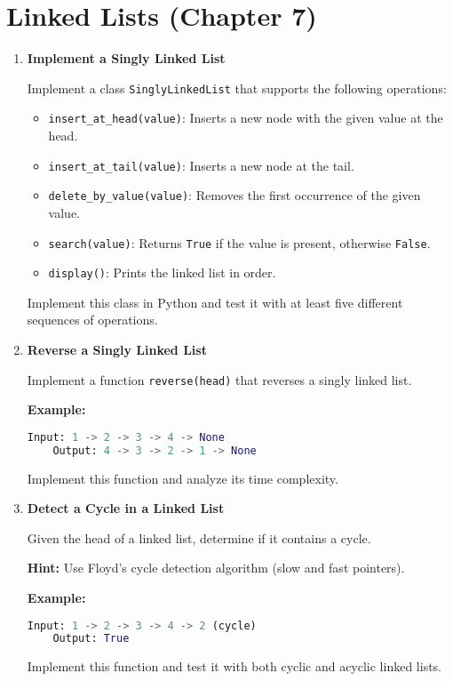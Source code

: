 \documentclass{article}
\begin{document}
\section*{Linked Lists (Chapter 7)}

\begin{enumerate}
    \item \textbf{Implement a Singly Linked List}
    
    Implement a class \texttt{SinglyLinkedList} that supports the following operations:
    \begin{itemize}
        \item \texttt{insert\_at\_head(value)}: Inserts a new node with the given value at the head.
        \item \texttt{insert\_at\_tail(value)}: Inserts a new node at the tail.
        \item \texttt{delete\_by\_value(value)}: Removes the first occurrence of the given value.
        \item \texttt{search(value)}: Returns \texttt{True} if the value is present, otherwise \texttt{False}.
        \item \texttt{display()}: Prints the linked list in order.
    \end{itemize}
    Implement this class in Python and test it with at least five different sequences of operations.
    
    \item \textbf{Reverse a Singly Linked List}
    
    Implement a function \texttt{reverse(head)} that reverses a singly linked list.
    
    \textbf{Example:}
    \begin{lstlisting}[language=Python]
    Input: 1 -> 2 -> 3 -> 4 -> None
    Output: 4 -> 3 -> 2 -> 1 -> None
    \end{lstlisting}
    Implement this function and analyze its time complexity.
    
    \item \textbf{Detect a Cycle in a Linked List}
    
    Given the head of a linked list, determine if it contains a cycle.
    
    \textbf{Hint:} Use Floyd’s cycle detection algorithm (slow and fast pointers).
    
    \textbf{Example:}
    \begin{lstlisting}[language=Python]
    Input: 1 -> 2 -> 3 -> 4 -> 2 (cycle)
    Output: True
    \end{lstlisting}
    Implement this function and test it with both cyclic and acyclic linked lists.
    

\end{enumerate}
\end{document}
